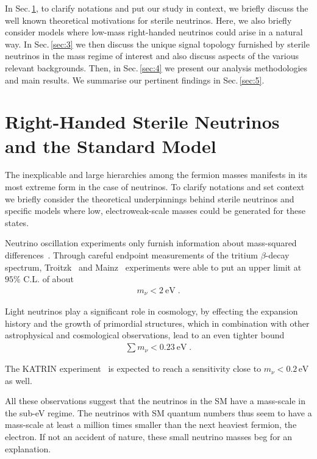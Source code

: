 \documentclass[reprint,doublecolumn,secnumarabic,amssymb, amsmath, aps,nofootinbib,superscriptaddress]{revtex4-1}
\newcommand{\bea}{\begin{eqnarray}}
\newcommand{\eea}{\end{eqnarray}}
\newcommand{\ba}{\begin{eqnarray*}}
\newcommand{\ea}{\end{eqnarray*}}
\newcommand{\Sec}[1]{Sec.\,\ref{#1}}
\newcommand{\Cit}[1]{~\cite{#1}}
\begin{document}
In \Sec{sec:2}, to clarify notations and put our study in context, we briefly discuss the well known theoretical motivations for sterile neutrinos. Here, we also briefly consider models where low-mass right-handed neutrinos could arise in a natural way. In \Sec{sec:3} we then discuss the unique signal topology furnished by sterile neutrinos in the mass regime of interest and also discuss aspects of the various relevant backgrounds. Then, in \Sec{sec:4} we present our analysis methodologies and main results. We summarise our pertinent findings in \Sec{sec:5}.



\section{\label{sec:2} Right-Handed Sterile Neutrinos and the Standard Model}
\label{sec:2}

The inexplicable and large hierarchies among the fermion masses manifests in its most extreme form in the case of neutrinos. To clarify notations and set context we briefly consider the theoretical underpinnings behind sterile neutrinos and specific models where  low, electroweak-scale masses could be generated for these states.

Neutrino oscillation experiments only furnish information about mass-squared differences\Cit{Olive:2016xmw}. Through careful endpoint measurements of the tritium $\beta$-decay spectrum, Troitzk~\cite{troitsk} and Mainz~\cite{mainz} experiments were able to put an upper limit at $95\%$ C.L. of about
\bea
m_\nu < 2~\text{eV}\; .
\eea

Light neutrinos play a significant role in cosmology, by effecting the expansion history and the growth of primordial structures, which in combination with other astrophysical and cosmological observations, lead to an even tighter bound~\cite{Reid:2009nq,GonzalezGarcia:2010un,Ade:2015xua}
\ba
\sum m_\nu < 0.23~\text{eV}\; .
\ea

The KATRIN experiment~\cite{KATRIN} is expected to reach a sensitivity close to $m_{\nu}<0.2\,\text{eV}$ as well. 

All these observations suggest that the neutrinos in the SM have a mass-scale in the sub-eV regime. The neutrinos with SM quantum numbers thus seem to have a mass-scale at least a million times smaller than the next heaviest fermion, the electron. If not an accident of nature, these small neutrino masses beg for an explanation.
\end{document}
